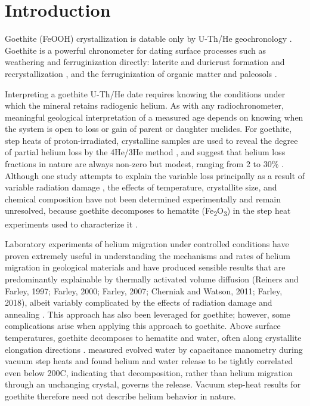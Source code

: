 \section{Introduction}\label{introduction}

Goethite (FeOOH) crystallization is datable only by U-Th/He
geochronology \citep{shustervasconcelos2005,farley2024}. Goethite is a
powerful chronometer for dating surface processes such as weathering and
ferruginization directly: laterite and duricrust formation and
recrystallization \citep{monteiro2014,allard2018,ansart2022}, and the
ferruginization of organic matter and paleosols \citep{heim2006,yappshuster2011,vasconcelos2013,danisik2013,hofmann2017}.

Interpreting a goethite U-Th/He date requires knowing the conditions
under which the mineral retains radiogenic helium. As with any
radiochronometer, meaningful geological interpretation of a measured age
depends on knowing when the system is open to loss or gain of parent or
daughter nuclides. For goethite, step heats of proton-irradiated,
crystalline samples are used to reveal the degree of partial helium loss
by the 4He/3He method \citep{shustervasconcelos2005}, and suggest that
helium loss fractions in nature are always non-zero but modest, ranging
from 2 to 30\% \citep{shustervasconcelos2005,heim2006,hofmann2017,deng2017}.
Although one study attempts to explain the variable loss principally as a
result of variable radiation damage \citep{bassal2022}, the effects of
temperature, crystallite size, and chemical composition have not been
determined experimentally and remain unresolved, because goethite
decomposes to hematite (Fe\textsubscript{2}O\textsubscript{3}) in the step
heat experiments used to characterize it \citep{farley2024}.

Laboratory experiments of helium migration under controlled conditions
have proven extremely useful in understanding the mechanisms and rates
of helium migration in geological materials and have produced sensible
results that are predominantly explainable by thermally activated volume
diffusion (Reiners and Farley, 1997; Farley, 2000; Farley, 2007;
Cherniak and Watson, 2011; Farley, 2018), albeit variably complicated by
the effects of radiation damage and annealing \citep{shuster2006,guenthner2013}. This approach has also been leveraged for
goethite; however, some complications arise when applying this approach
to goethite. Above surface temperatures, goethite decomposes to hematite
and water, often along crystallite elongation directions \citep{goss1987}.
\citet{farley2024} measured evolved water by capacitance manometry during
vacuum step heats and found helium and water release to be tightly
correlated even below 200\textdegree C, indicating that decomposition,
rather than helium migration through an unchanging crystal, governs the
release. Vacuum step-heat results for goethite therefore need not describe
helium behavior in nature.

